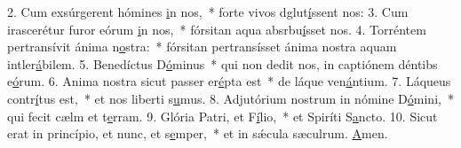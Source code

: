 2. Cum exsúrgerent hómines \uline{i}n nos,~* forte vivos dglut\uline{í}ssent nos:
3. Cum irascerétur furor eórum \uline{i}n nos,~* fórsitan aqua absrbu\uline{í}sset nos.
4. Torréntem pertransívit ánima n\uline{o}stra:~* fórsitan pertransísset ánima nostra aquam intler\uline{á}bilem.
5. Benedíctus D\uline{ó}minus~* qui non dedit nos, in captiónem déntibs e\uline{ó}rum.
6. Anima nostra sicut passer er\uline{é}pta est~* de láque ven\uline{á}ntium.
7. Láqueus contr\uline{í}tus est,~* et nos liberti s\uline{u}mus.
8. Adjutórium nostrum in nómine D\uline{ó}mini,~* qui fecit cælm et t\uline{e}rram.
9. Glória Patri, et F\uline{í}lio,~* et Spiríti S\uline{a}ncto.
10. Sicut erat in princípio, et nunc, et s\uline{e}mper,~* et in sǽcula sæculrum. \uline{A}men.
